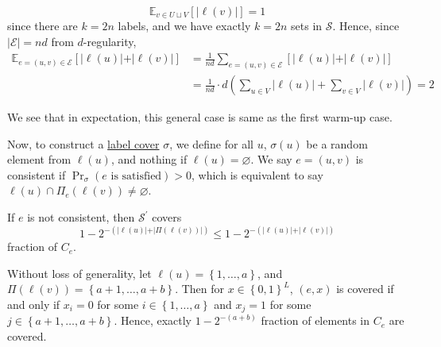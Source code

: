 \begin{enumerate}[(a)]
	      \[
		      \mathbb{E}_{v\in U \sqcup V}\left[ \vert \ell (v) \vert \right] = 1
	      \]
	      since there are \(k=2n\) labels, and we have exactly \(k=2n\) sets in \(\mathcal{S} \). Hence, since \(\vert \mathcal{E}  \vert = nd \) from \(d\)-regularity,
	      \[
		      \begin{split}
			      \mathbb{E}_{e=(u, v)\in \mathcal{E} }\left[ \vert \ell (u) \vert + \vert \ell (v) \vert \right]
			      &= \frac{1}{nd} \sum_{e=(u, v)\in \mathcal{E} } \left[ \vert \ell (u) \vert + \vert \ell (v) \vert  \right]\\
			      &= \frac{1}{nd}\cdot d \left( \sum_{u\in V} \vert \ell (u) \vert + \sum_{v\in V} \vert \ell (v) \vert \right)
			      = 2
		      \end{split}
	      \]
	      \begin{intuition}
		      We see that in expectation, this general case is same as the first warm-up case.
	      \end{intuition}
	      Now, to construct a \hyperref[prb:label-cover]{label cover} \(\sigma \), we define for all \(u\), \(\sigma (u)\) be a random element from \(\ell (u)\), and nothing if \(\ell (u) = \varnothing \). We say \(e=(u, v)\) is consistent if \(\Pr_{\sigma }(e \text{ is satisfied} ) > 0\), which is equivalent to say \(\ell (u) \cap \Pi _e(\ell (v)) \neq \varnothing \).
	      \begin{claim}
		      If \(e\) is not consistent, then \(\mathcal{S} ^\prime \) covers
		      \[
			      1 - 2^{- (\vert \ell (u) \vert + \vert \Pi (\ell (v)) \vert )} \leq 1 - 2^{- (\vert \ell (u) \vert + \vert \ell (v) \vert )}
		      \]
		      fraction of \(C_e\).
	      \end{claim}
	      \begin{explanation}
		      Without loss of generality, let \(\ell (u) = \left\{ 1, \ldots , a  \right\} \), and \(\Pi (\ell (v)) = \left\{ a+1, \ldots , a+b \right\} \). Then for \(x\in \left\{ 0, 1 \right\} ^L\), \((e, x)\) is covered if and only if \(x_i = 0\) for some \(i\in \left\{ 1, \ldots , a  \right\} \) and \(x_j = 1\) for some \(j\in \left\{ a+1, \ldots , a+b  \right\} \). Hence, exactly \(1-2^{-(a+b)}\) fraction of elements in \(C_e\) are covered.
	      \end{explanation}


\end{enumerate}
